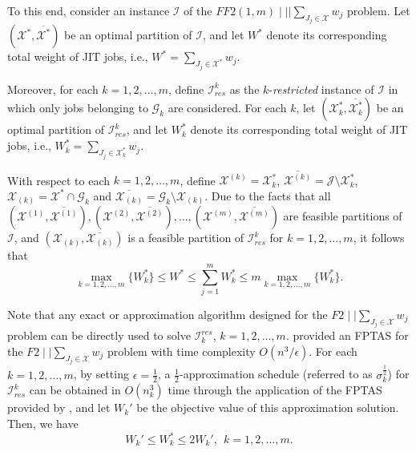 \documentclass[12pt, eqno, limlimits]{article}
\begin{document}
\begin{sloppypar}
        To this end, consider an instance $\mathcal{I}$ of the $FF2(1, m) \mid \mid | \sum_{J_j \in \mathcal{X}} w_j$ problem. Let $(\mathcal{X}^{*}, \overline{\mathcal{X}^{*}})$ be an optimal partition of $\mathcal{I}$, and let $W^{*}$ denote its corresponding total weight of JIT jobs, i.e., $W^{*}=\sum_{J_j \in \mathcal{X}^{*}} w_j$.
        
        Moreover, for each $k=1, 2, \ldots, m$, define $\mathcal{I}_{res}^k$ as the $k$-\textit{restricted} instance of $\mathcal{I}$ in which only jobs belonging to $\mathcal{G}_k$ are considered. For each $k$, let $(\mathcal{X}_k^{*}, \overline{\mathcal{X}_k^{*}})$ be an optimal partition of $\mathcal{I}_{res}^k$, and let $W_k^{*}$ denote its corresponding total weight of JIT jobs, i.e., $W_k^{*}=\sum_{J_j \in \mathcal{X}_k^{*}} w_j$. 
        
        With respect to each $k=1, 2, \ldots, m$, define $\mathcal{X}^{(k)}=\mathcal{X}_k^{*}$,  $\overline{\mathcal{X}^{(k)}}=\mathcal{J} \setminus \mathcal{X}_k^{*}$,  $\mathcal{X}_{(k)}=\mathcal{X}^{*} \cap \mathcal{G}_k$ and $\overline{\mathcal{X}_{(k)}}=\mathcal{G}_k \setminus \mathcal{X}_{(k)}$. Due to the facts that all $(\mathcal{X}^{(1)}, \overline{\mathcal{X}^{(1)}}), (\mathcal{X}^{(2)}, \overline{\mathcal{X}^{(2)}}), \ldots, (\mathcal{X}^{(m)}, \overline{\mathcal{X}^{(m)}})$ are feasible partitions of $\mathcal{I}$, and $(\mathcal{X}_{(k)}, \overline{\mathcal{X}_{(k)}})$ is a feasible partition of $\mathcal{I}_{res}^k$ for $k=1, 2, \ldots, m$, it follows that 
        \begin{equation} \label{Eq-3.2.1}
            \max_{k=1, 2, \ldots, m}\{W_k^{*}\} \leq W^{*} \leq \sum_{j=1}^m W_k^{*} \leq m \max_{k=1, 2, \ldots, m}\{W_k^{*}\}.
        \end{equation}
        
        Note that any exact or approximation algorithm designed for the $F2 \mid \mid \sum_{J_j \in \mathcal{X}} w_j$ problem can be directly used to solve $\mathcal{I}_k^{res}$,  $k=1, 2, \ldots, m$. \cite{Elalouf2013JOS} provided an FPTAS for the $F2 \mid \mid \sum_{J_j \in \mathcal{X}} w_j$ problem with time complexity $O(n^3/\epsilon)$. For each $k=1, 2, \ldots, m$, by setting $\epsilon=\frac{1}{2}$, a  $\frac{1}{2}$-approximation schedule (referred to as $\sigma_k^{\frac{1}{2}}$) for $\mathcal{I}_{res}^k$ can be obtained  in $O(n_k^3)$ time through the application of the FPTAS provided by \cite{Elalouf2013JOS}, and let $W_k'$ be the objective value of this approximation solution. Then, we have 
        \begin{equation} \label{Eq-3.2.2}
            W_k' \leq W_k^{*} \leq 2 W_k', ~~ k=1, 2, \ldots, m.
        \end{equation}
        

\end{sloppypar}
\end{document}
